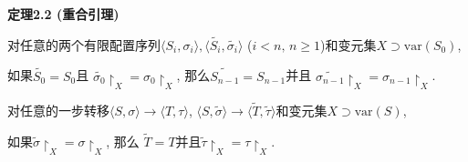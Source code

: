 \documentclass[UTF8]{ctexart}
\begin{document}
\hypertarget{sec:定理2.2}{}
\noindent\textbf{定理2.2 (重合引理)}

对任意的两个有限配置序列$\langle S_i,\sigma_i\rangle,
\langle\widetilde{S_i},\widetilde{\sigma_i}\rangle$
($i<n,\,n\geqslant 1$)和变元集$X\supset\mathrm{var}(S_0)$,

\vspace{1pt}
如果$\widetilde{S_0}=S_0$且
$\widetilde{\sigma_0}\!\restriction_X=\sigma_0\!\restriction_X$,
那么$\widetilde{S_{n-1}}=S_{n-1}$并且
$\widetilde{\sigma_{n-1}}\!\restriction_X=\sigma_{n-1}\!\restriction_X$.


\vspace{1pt}\hspace{-1em}
对任意的一步转移$\langle S,\sigma\rangle\to\langle T,\tau\rangle$,
$\langle S,\widetilde{\sigma}\rangle\to
\langle\widetilde{T},\widetilde{\tau}\rangle$和变元集$X\supset\mathrm{var}(S)$,

\vspace{1pt}\hspace{2.17em}
如果$\widetilde{\sigma}\!\restriction_X=\sigma\!\restriction_X$, 那么
$\widetilde{T}=T$并且$\widetilde{\tau}\!\restriction_X=\tau\!\restriction_X$.

\vspace{3pt}
\end{document}
